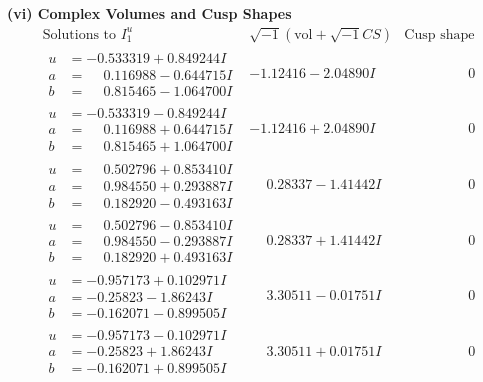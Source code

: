 \documentclass[1p]{elsarticle_modified}
\theoremstyle{definition}
\newcommand{\I}{\sqrt{-1}}
\begin{document}
\newpage\flushleft \textbf{(vi) Complex Volumes and Cusp Shapes}
$$\begin{array}{c|c|c}  
\text{Solutions to }I^u_{1}& \I (\text{vol} + \sqrt{-1}CS) & \text{Cusp shape}\\
 \hline 
\begin{aligned}
u &= -0.533319 + 0.849244 I \\
a &= \phantom{-}0.116988 - 0.644715 I \\
b &= \phantom{-}0.815465 - 1.064700 I\end{aligned}
 & -1.12416 - 2.04890 I & \phantom{-0.000000 } 0 \\ \hline\begin{aligned}
u &= -0.533319 - 0.849244 I \\
a &= \phantom{-}0.116988 + 0.644715 I \\
b &= \phantom{-}0.815465 + 1.064700 I\end{aligned}
 & -1.12416 + 2.04890 I & \phantom{-0.000000 } 0 \\ \hline\begin{aligned}
u &= \phantom{-}0.502796 + 0.853410 I \\
a &= \phantom{-}0.984550 + 0.293887 I \\
b &= \phantom{-}0.182920 - 0.493163 I\end{aligned}
 & \phantom{-}0.28337 - 1.41442 I & \phantom{-0.000000 } 0 \\ \hline\begin{aligned}
u &= \phantom{-}0.502796 - 0.853410 I \\
a &= \phantom{-}0.984550 - 0.293887 I \\
b &= \phantom{-}0.182920 + 0.493163 I\end{aligned}
 & \phantom{-}0.28337 + 1.41442 I & \phantom{-0.000000 } 0 \\ \hline\begin{aligned}
u &= -0.957173 + 0.102971 I \\
a &= -0.25823 - 1.86243 I \\
b &= -0.162071 - 0.899505 I\end{aligned}
 & \phantom{-}3.30511 - 0.01751 I & \phantom{-0.000000 } 0 \\ \hline\begin{aligned}
u &= -0.957173 - 0.102971 I \\
a &= -0.25823 + 1.86243 I \\
b &= -0.162071 + 0.899505 I\end{aligned}
 & \phantom{-}3.30511 + 0.01751 I & \phantom{-0.000000 } 0 \\ \hline\begin{aligned}

\end{aligned}
\end{array}$$
\end{document}
